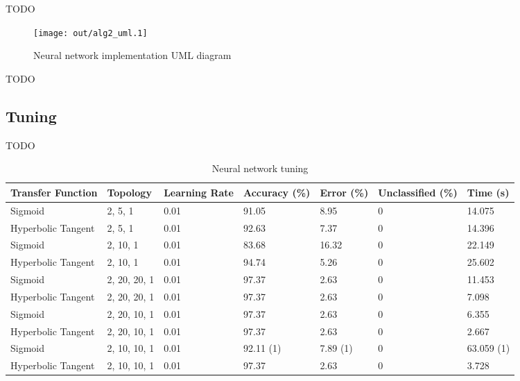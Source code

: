 \documentclass[a4paper]{article}
\begin{document}
TODO

\begin{figure}[h!]
  \centering
  \texttt{[image: out/alg2\_uml.1]}
  \caption{Neural network implementation UML diagram}
  \label{fig:alg2_uml}
\end{figure}

TODO

\subsection{Tuning}

TODO

\begin{table}[h!]
  \centering
  \begin{tabular}{@{}lllllll@{}}
    \toprule
    Transfer Function  & Topology     & Learning Rate & Accuracy (\%) & Error (\%) & Unclassified (\%) & Time (s)   \\
    \midrule
    Sigmoid            & 2, 5, 1      & 0.01          & 91.05         & 8.95       & 0                 & 14.075     \\
    Hyperbolic Tangent & 2, 5, 1      & 0.01          & 92.63         & 7.37       & 0                 & 14.396     \\
    Sigmoid            & 2, 10, 1     & 0.01          & 83.68         & 16.32      & 0                 & 22.149     \\
    Hyperbolic Tangent & 2, 10, 1     & 0.01          & 94.74         & 5.26       & 0                 & 25.602     \\
    Sigmoid            & 2, 20, 20, 1 & 0.01          & 97.37         & 2.63       & 0                 & 11.453     \\
    Hyperbolic Tangent & 2, 20, 20, 1 & 0.01          & 97.37         & 2.63       & 0                 & 7.098      \\
    Sigmoid            & 2, 20, 10, 1 & 0.01          & 97.37         & 2.63       & 0                 & 6.355      \\
    Hyperbolic Tangent & 2, 20, 10, 1 & 0.01          & 97.37         & 2.63       & 0                 & 2.667      \\
    Sigmoid            & 2, 10, 10, 1 & 0.01          & 92.11 (1)     & 7.89 (1)   & 0                 & 63.059 (1) \\
    Hyperbolic Tangent & 2, 10, 10, 1 & 0.01          & 97.37         & 2.63       & 0                 & 3.728      \\
    \bottomrule
  \end{tabular}
  \caption{Neural network tuning}
  \label{tab:nn_tuning}
\end{table}
\end{document}
